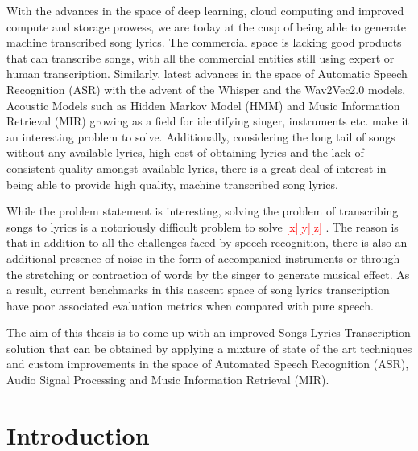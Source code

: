 With the advances in the space of deep learning, cloud computing and improved compute and storage prowess, we are today at the cusp of being able to generate machine transcribed song lyrics. The commercial space is lacking good products that can transcribe songs, with all the commercial entities still using expert or human transcription. Similarly, latest advances in the space of Automatic Speech Recognition (ASR) with the advent of the Whisper and the Wav2Vec2.0 models, Acoustic Models such as Hidden Markov Model (HMM) and Music Information Retrieval (MIR) growing as a field for identifying singer, instruments etc. make it an interesting problem to solve. Additionally, considering the long tail of songs without any available lyrics, high cost of obtaining lyrics and the lack of consistent quality amongst available lyrics, there is a great deal of interest in being able to provide high quality, machine transcribed song lyrics. 

While the problem statement is interesting, solving the problem of transcribing songs to lyrics is a notoriously difficult problem to solve \textcolor{red}{[x][y][z]} . The reason is that in addition to all the challenges faced by speech recognition, there is also an additional presence of noise in the form of accompanied instruments or through the stretching or contraction of words by the singer to generate musical effect. As a result, current benchmarks in this nascent space of song lyrics transcription have poor associated evaluation metrics when compared with pure speech.

The aim of this thesis is to come up with an improved Songs Lyrics Transcription solution that can be obtained by applying a mixture of state of the art techniques and custom improvements in the space of Automated Speech Recognition (ASR), Audio Signal Processing and Music Information Retrieval (MIR).

\section{Introduction}
\label{sec:introduction}

